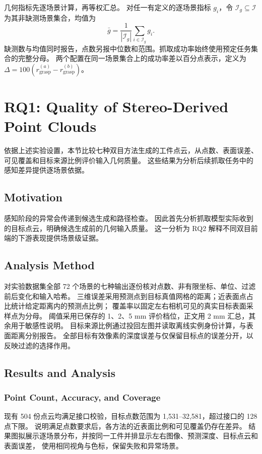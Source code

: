 \documentclass[UTF8,fontset=fandol,a4paper,11pt]{ctexart}
\newcommand{\qyb}[1]{\textcolor{red!75!black}{#1}}
\begin{document}
几何指标先逐场景计算，再等权汇总。
对任一有定义的逐场景指标 $g_i$，令 $\mathcal I_g\subseteq\mathcal I$ 为其非缺测场景集合，均值为
\[
 \bar g=\frac{1}{|\mathcal I_g|}\sum_{i\in\mathcal I_g}g_i.
\]
缺测数与均值同时报告，点数另报中位数和范围。抓取成功率始终使用预定任务集合的完整分母。
两个配置在同一场景集合上的成功率差以百分点表示，定义为 $\Delta=100(r_{\mathrm{grasp}}^{(a)}-r_{\mathrm{grasp}}^{(b)})$。

\section{\qyb{RQ1: Quality of Stereo-Derived Point Clouds}}
\label{sec:rq1}

依据上述实验设置，本节比较七种双目方法生成的工件点云，从点数、表面误差、可见覆盖和目标来源比例评价输入几何质量。
这些结果为分析后续抓取任务中的感知差异提供逐场景依据。

\subsection{\qyb{Motivation}}

感知阶段的异常会传递到候选生成和路径检查。
因此首先分析抓取模型实际收到的目标点云，明确候选生成前的几何输入质量。
这一分析为 RQ2 解释不同双目前端的下游表现提供场景级证据。

\subsection{\qyb{Analysis Method}}

对实验数据集全部 72 个场景的七种输出逐份核对点数、非有限坐标、单位、过滤前后变化和输入哈希。
三维误差采用预测点到目标真值网格的距离；近表面点占比统计给定距离内的预测点比例；
覆盖率以固定左右相机可见的真实目标表面采样点为分母。
阈值采用已保存的 1、2、5 mm 评价档位，正文用 2 mm 汇总，其余用于敏感性说明。
目标来源比例通过投回左图并读取离线实例身份计算，与表面距离分别报告。
全部目标有效像素的深度误差与仅保留目标点的误差分开，以反映过滤的选择作用。

\subsection{\qyb{Results and Analysis}}

\subsubsection{Point Count, Accuracy, and Coverage}

现有 504 份点云均满足接口校验，目标点数范围为 1,531--32,581，超过接口的 128 点下限。
说明满足点数要求后，各方法的近表面比例和可见覆盖仍存在差异。
结果图拟展示逐场景分布，并按同一工件并排显示左右图像、预测深度、目标点云和表面误差，
使用相同视角与色标，保留失败和异常场景。
\end{document}
